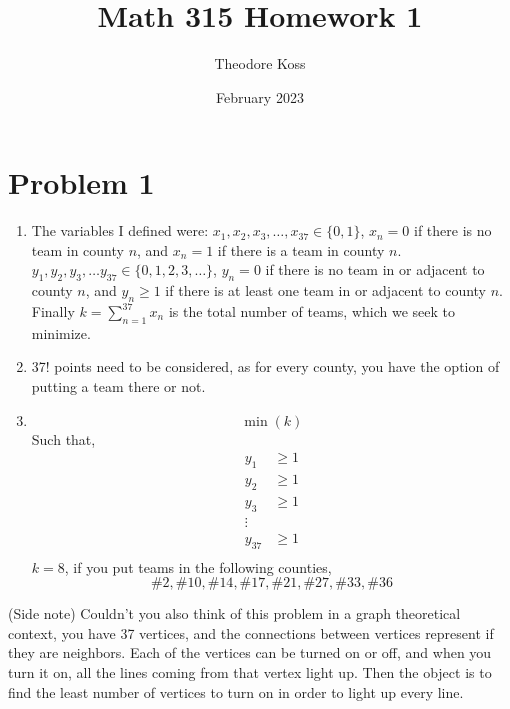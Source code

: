 \documentclass{article}
\title{Math 315 Homework 1}
\author{Theodore Koss}
\date{February 2023}
\begin{document}
\maketitle

\section*{Problem 1}
\begin{enumerate}[label=(\alph*)]
    \item The variables I defined were: $x_1,x_2,x_3,\dots,x_{37}\in\{0,1\}$, $x_n=0$ if there is no team in county $n$, and $x_n=1$ if there is a team in county $n$. $y_1,y_2,y_3,\dots y_{37}\in\{0,1,2,3,\dots\}$, $y_n=0$ if there is no team in or adjacent to county $n$, and $y_n\geq1$ if there is at least one team in or adjacent to county $n$. Finally $k=\sum_{n=1}^{37}x_n$ is the total number of teams, which we seek to minimize.
    \item 37! points need to be considered, as for every county, you have the option of putting a team there or not.
    \item $$\min(k)$$ Such that, \begin{align*}
        y_1&\geq1\\
        y_2&\geq1\\
        y_3&\geq1\\
        \vdots\\
        y_{37}&\geq1\\
    \end{align*} $k=8$, if you put teams in the following counties, $$\#2,\#10,\#14,\#17,\#21,\#27,\#33,\#36$$
\end{enumerate}(Side note) Couldn't you also think of this problem in a graph theoretical context, you have 37 vertices, and the connections between vertices represent if they are neighbors. Each of the vertices can be turned on or off, and when you turn it on, all the lines coming from that vertex light up. Then the object is to find the least number of vertices to turn on in order to light up every line.
\end{document}
